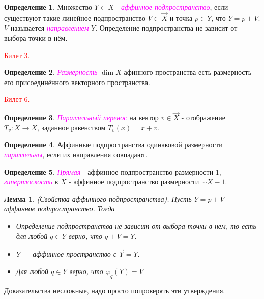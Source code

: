 \documentclass[a4paper,100pt]{article}
\theoremstyle{indented}
\newtheorem{lemma}{Лемма}
\theoremstyle{definition}
\newtheorem{defn}{Определение}
\theoremstyle{remark}
\DeclareMathOperator{\ra}{\rightarrow}
\begin{document}
\begin{defn}
    Множество $Y\subset X$ - \textit{\textcolor{magenta}{\hypertarget{s13}{аффинное подпространство}}}, если существуют такие линейное подпространство $V\subset \vec{X}$ и точка $p\in Y$, что $Y=p+V$. $V$ называется \textit{\textcolor{magenta}{\hypertarget{s14}{направлением}}} $Y$. Определение подпространства не зависит от выбора точки в нём.
\end{defn}



\textcolor{red}{\hypertarget{b3}{Билет 3.}}

\begin{defn}
    \textit{\textcolor{magenta}{\hypertarget{s15}{Размерность}}} $\dim X$ афинного пространства есть размерность его присоединённого векторного пространства.
\end{defn}

\textcolor{red}{\hypertarget{b6}{Билет 6.}}

\begin{defn}
    \textit{\textcolor{magenta}{\hypertarget{s16}{Параллельный перенос}}} на вектор $v\in \vec{X}$ - отображение $T_v:X\ra X$, заданное равенством $T_v(x)=x+v$. 
\end{defn}

\begin{defn}
    Аффинные подпространства одинаковой размерности \textit{\textcolor{magenta}{\hypertarget{s17}{параллельны}}}, если их направления совпадают.
\end{defn}

\begin{defn}
    \textit{\textcolor{magenta}{\hypertarget{s18}{Прямая}}} - аффинное подпространство размерности 1, \textit{\textcolor{magenta}{\hypertarget{s19}{гиперплоскость}}} в $X$ - аффинное подпространство размерности $\sim X - 1$. 
\end{defn}

\begin{lemma} (Свойства аффинного подпространства).
     Пусть $Y = p+V$ --- аффинное подпространство. Тогда 
\begin{itemize}
\item Определение подпространства не зависит от выбора точки в нем, то есть для любой $q\in Y$ верно, что $q+V = Y$.
\item $Y$ --- аффинное пространство с $\overrightarrow{Y} = Y.$
\item Для любой $q\in Y$ верно, что $\varphi_q(Y) = V$
\end{itemize}
\end{lemma}
Доказательства несложные, надо просто попроверять эти утверждения.
\end{document}
